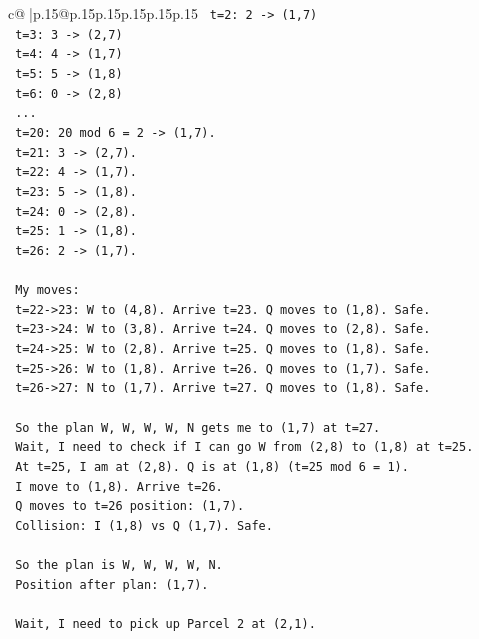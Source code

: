\documentclass{article}
\begin{document}
{\begin{supertabular}{c@{$\;$}|p{.15\linewidth}@{}p{.15\linewidth}p{.15\linewidth}p{.15\linewidth}p{.15\linewidth}p{.15\linewidth}}
{{{\texttt{   t=2: 2 {-}> (1,7)} \\
\texttt{   t=3: 3 {-}> (2,7)} \\
\texttt{   t=4: 4 {-}> (1,7)} \\
\texttt{   t=5: 5 {-}> (1,8)} \\
\texttt{   t=6: 0 {-}> (2,8)} \\
\texttt{   ...} \\
\texttt{   t=20: 20 mod 6 = 2 {-}> (1,7).} \\
\texttt{   t=21: 3 {-}> (2,7).} \\
\texttt{   t=22: 4 {-}> (1,7).} \\
\texttt{   t=23: 5 {-}> (1,8).} \\
\texttt{   t=24: 0 {-}> (2,8).} \\
\texttt{   t=25: 1 {-}> (1,8).} \\
\texttt{   t=26: 2 {-}> (1,7).} \\
\\ 
\texttt{   My moves:} \\
\texttt{   t=22{-}>23: W to (4,8). Arrive t=23. Q moves to (1,8). Safe.} \\
\texttt{   t=23{-}>24: W to (3,8). Arrive t=24. Q moves to (2,8). Safe.} \\
\texttt{   t=24{-}>25: W to (2,8). Arrive t=25. Q moves to (1,8). Safe.} \\
\texttt{   t=25{-}>26: W to (1,8). Arrive t=26. Q moves to (1,7). Safe.} \\
\texttt{   t=26{-}>27: N to (1,7). Arrive t=27. Q moves to (1,8). Safe.} \\
\\ 
\texttt{   So the plan W, W, W, W, N gets me to (1,7) at t=27.} \\
\texttt{   Wait, I need to check if I can go W from (2,8) to (1,8) at t=25.} \\
\texttt{   At t=25, I am at (2,8). Q is at (1,8) (t=25 mod 6 = 1).} \\
\texttt{   I move to (1,8). Arrive t=26.} \\
\texttt{   Q moves to t=26 position: (1,7).} \\
\texttt{   Collision: I (1,8) vs Q (1,7). Safe.} \\
\\ 
\texttt{   So the plan is W, W, W, W, N.} \\
\texttt{   Position after plan: (1,7).} \\
\\ 
\texttt{   Wait, I need to pick up Parcel 2 at (2,1).} \\
}}}
\end{supertabular}}
\end{document}
